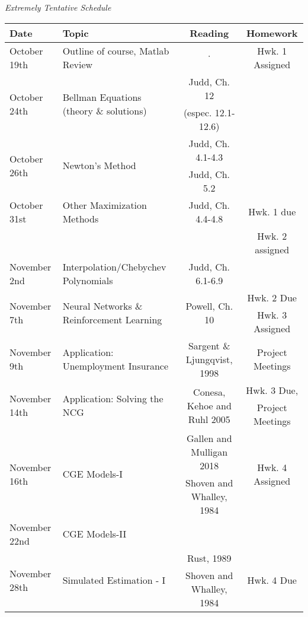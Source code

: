 \documentclass[a4paper]{article}
\begin{document}
\emph{Extremely Tentative Schedule}
\begin{table}[ht!]
\centering
\begin{tabular}{|l|l|c|c|}
\hline
Date & Topic & Reading & Homework \\
\hline
\multirow{2}{*}{October 19th} &  \multirow{2}{*}{Outline of course, Matlab Review}  & \multirow{2}{*}{$\cdot$} & \multirow{2}{*}{Hwk. 1 Assigned} \\
 &    &  & \\
\hline
\multirow{2}{*}{October 24th} & \multirow{2}{*}{Bellman Equations (theory \& solutions)} &  Judd, Ch. 12 &  \\
 & & (espec. 12.1-12.6) & \\
\hline
\multirow{2}{*}{October 26th} & \multirow{2}{*}{Newton's Method} &  Judd, Ch. 4.1-4.3 &  \\
 &  &  Judd, Ch. 5.2 & \\
\hline
October 31st & Other Maximization Methods & Judd, Ch. 4.4-4.8  & Hwk. 1 due\\ 
 & & & Hwk. 2 assigned\\
\hline
November 2nd & Interpolation/Chebychev Polynomials & Judd, Ch. 6.1-6.9  & \\
\hline
\multirow{2}{*}{November 7th} &  \multirow{2}{*}{Neural Networks \& Reinforcement Learning} & \multirow{2}{*}{Powell, Ch. 10} & Hwk. 2 Due \\
 &     &  &  Hwk. 3 Assigned\\
\hline
\multirow{2}{*}{November 9th} & \multirow{2}{*}{Application: Unemployment Insurance} & \multirow{2}{*}{Sargent \& Ljungqvist, 1998}  & \multirow{2}{*}{Project Meetings} \\
 &  &  &  \\
\hline
\multirow{2}{*}{November 14th} & \multirow{2}{*}{Application: Solving the NCG} & \multirow{2}{*}{Conesa, Kehoe and Ruhl 2005} & Hwk. 3 Due, \\
 &  &  & Project Meetings \\
 \hline
 \multirow{2}{*}{November 16th} & \multirow{2}{*}{CGE Models-I }& Gallen and Mulligan 2018 & \multirow{2}{*}{Hwk. 4 Assigned}\\
 &  & Shoven and Whalley, 1984 & \\
 \hline
 November 22nd  & CGE Models-II &  & \\
 \hline
 \multirow{2}{*}{November 28th} & \multirow{2}{*}{Simulated Estimation - I } & Rust, 1989 & \multirow{2}{*}{Hwk. 4 Due}\\
 &  & Shoven and Whalley, 1984 & \\

\end{tabular}
\end{table}
\end{document}
